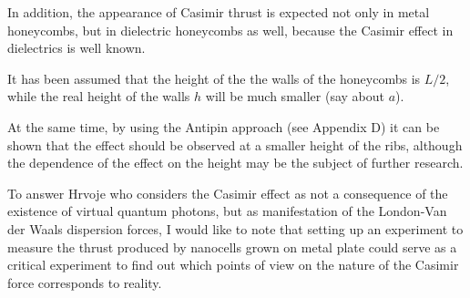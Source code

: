\documentclass[twoside, 10pt]{article}
\def\myvspacebeforesubsection{-2.0mm}
\def\myvspaceaftersubsection{-2.5mm}
\begin{document}
\begin{multicols}{2}
    In addition, the appearance of Casimir thrust is expected not only in metal honeycombs,
but in dielectric honeycombs as well, because the Casimir effect in dielectrics
is well known.

    It has been assumed that the height of the the walls of the honeycombs is \(L/2\),
while the real height of the walls \(h\) will be much smaller (say about \(a\)).

    At the same time, by using the Antipin approach (see Appendix D) it can be
shown that the effect should be observed at a smaller height of the
ribs, although the dependence of the effect on the height may be the
subject of further research.

    To answer Hrvoje \cite{Hrvoje2016} who considers the Casimir
effect as not a consequence of the existence of virtual quantum photons,
but as manifestation of the London-Van der Waals dispersion
forces, I would like to note that setting up an experiment to measure the thrust
produced by nanocells grown on metal plate could serve as a critical
experiment to find out which points of view on the nature of the
Casimir force corresponds to reality.

\end{multicols}

\vspace{\myvspacebeforesubsection}
    \subsection*{}\label{appendix-a.-integration-details}
\vspace{\myvspaceaftersubsection}
\end{document}
